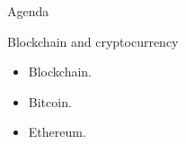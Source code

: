 
\begin{frame}{Agenda}
  \begin{block}{Blockchain and cryptocurrency}
    \begin{itemize}
      \item Blockchain.
      \item Bitcoin.
      \item Ethereum.
    \end{itemize}
  \end{block}
\end{frame}

